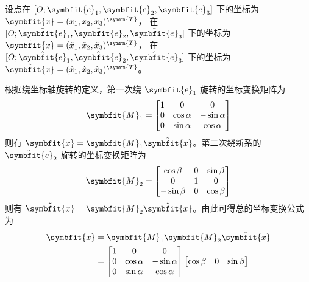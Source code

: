 \begin{solution}
    设点在 $[O; \symbfit{e}_1, \symbfit{e}_2, \symbfit{e}_3]$ 下的坐标为 $\symbfit{x} = (x_1, x_2, x_3)^{\symrm{T}}$，
    在 $[O; \tilde{\symbfit{e}}_1, \tilde{\symbfit{e}}_2, \tilde{\symbfit{e}}_3]$ 下的坐标为 $\tilde{\symbfit{x}} = (\tilde{x}_1, \tilde{x}_2, \tilde{x}_3)^{\symrm{T}}$，
    在 $[O; \hat{\symbfit{e}}_1, \allowbreak \hat{\symbfit{e}}_2, \allowbreak \hat{\symbfit{e}}_3]$ 下的坐标为 $\hat{\symbfit{x}} = (\hat{x}_1, \hat{x}_2, \hat{x}_3)^{\symrm{T}}$。

    根据绕坐标轴旋转的定义，第一次绕 $\symbfit{e}_1$ 旋转的坐标变换矩阵为
    \begin{equation}
        \symbfit{M}_1 = \begin{bmatrix}
            1 & 0          & 0           \\
            0 & \cos\alpha & -\sin\alpha \\
            0 & \sin\alpha & \cos\alpha
        \end{bmatrix}
    \end{equation}
    则有 $\symbfit{x} = \symbfit{M}_1 \tilde{\symbfit{x}}$。第二次绕新系的 $\tilde{\symbfit{e}}_2$ 旋转的坐标变换矩阵为
    \begin{equation}
        \symbfit{M}_2 = \begin{bmatrix}
            \cos\beta  & 0 & \sin\beta \\
            0          & 1 & 0         \\
            -\sin\beta & 0 & \cos\beta
        \end{bmatrix}
    \end{equation}
    则有 $\tilde{\symbfit{x}} = \symbfit{M}_2 \hat{\symbfit{x}}$。由此可得总的坐标变换公式为
    \begin{equation}
        \begin{aligned}
            \symbfit{x} & = \symbfit{M}_1 \symbfit{M}_2 \hat{\symbfit{x}}                \\
                        & = \begin{bmatrix}
                                1 & 0          & 0           \\
                                0 & \cos\alpha & -\sin\alpha \\
                                0 & \sin\alpha & \cos\alpha
                            \end{bmatrix} \begin{bmatrix}
                                              \cos\beta  & 0 & \sin\beta \\

\end{bmatrix}
\end{aligned}
\end{equation}
\end{solution}
